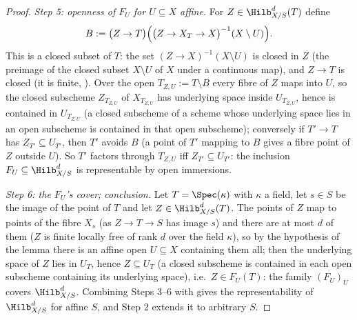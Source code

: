 \begin{proof}
\emph{Step 5: openness of $F_U$ for $U\subseteq X$ affine.}  For
$Z\in\Hilb^d_{X/S}(T)$ define
\[
B:=\bigl(Z\to T\bigr)\Bigl(\bigl(Z\to X_T\to X\bigr)^{-1}(X\setminus U)\Bigr) .
\]
This is a closed subset of $T$: the set $(Z\to X)^{-1}(X\setminus U)$
is closed in $Z$ (the preimage of the closed subset $X\setminus U$ of
$X$ under a continuous map), and $Z\to T$ is closed (it is finite,
).  Over the open
$T_{Z,U}:=T\setminus B$ every fibre of $Z$ maps into $U$, so the
closed subscheme $Z_{T_{Z,U}}$ of $X_{T_{Z,U}}$ has underlying space
inside $U_{T_{Z,U}}$, hence is contained in $U_{T_{Z,U}}$ (a closed
subscheme of a scheme whose underlying space lies in an open
subscheme is contained in that open subscheme); conversely if
$T'\to T$ has $Z_{T'}\subseteq U_{T'}$, then $T'$ avoids $B$ (a point
of $T'$ mapping to $B$ gives a fibre point of $Z$ outside $U$).
So $T'$ factors through $T_{Z,U}$ iff $Z_{T'}\subseteq U_{T'}$: the
inclusion $F_U\subseteq\Hilb^d_{X/S}$ is representable by open
immersions.

\emph{Step 6: the $F_U$'s cover; conclusion.}  Let $T=\Spec(\kappa)$
with $\kappa$ a field, let $s\in S$ be the image of the point of $T$
and let $Z\in\Hilb^d_{X/S}(T)$.  The points of $Z$ map to points of
the fibre $X_s$ (as $Z\to T\to S$ has image $s$) and there are at most
$d$ of them ($Z$ is finite locally free of rank $d$ over the field
$\kappa$), so by the hypothesis of the lemma there is an affine open
$U\subseteq X$ containing them all; then the underlying space of $Z$
lies in $U_T$, hence $Z\subseteq U_T$ (a closed subscheme is contained
in each open subscheme containing its underlying space), i.e.\
$Z\in F_U(T)$: the family $(F_U)_U$ covers $\Hilb^d_{X/S}$.  Combining
Steps 3--6 with \Cref{lem:pc-schemes-criterion} gives the
representability of $\Hilb^d_{X/S}$ for affine $S$, and Step 2 extends
it to arbitrary $S$.
\end{proof}

